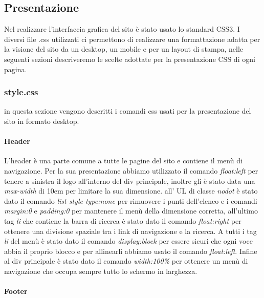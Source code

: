 \subsection{Presentazione}
Nel realizzare l'interfaccia grafica del sito è stato usato lo standard CSS3.\newline
I diversi file .css utilizzati ci permettono di realizzare una formattazione adatta per la visione del sito da un desktop, un mobile e per un layout di stampa, nelle seguenti sezioni descriveremo le scelte adottate per la presentazione CSS di ogni pagina.

\subsubsection{style.css}
in questa sezione vengono descritti i comandi css usati per la presentazione del sito in formato desktop.

\paragraph{Header} \mbox{}
L'header è una parte comune a tutte le pagine del sito e contiene il menù di navigazione. \newline Per la sua presentazione abbiamo utilizzato il comando \emph{float:left} per tenere a sinistra il logo all'interno del div principale, inoltre gli è stato data una \emph{max-width} di 10em per limitare la sua dimensione. all' UL di classe \emph{nodot} è stato dato il comando \emph{list-style-type:none} per rimuovere i punti dell'elenco e i comandi \emph{margin:0} e \emph{padding:0} per mantenere il menù della dimensione corretta, all'ultimo tag \emph{li} che contiene la barra di ricerca è stato dato il comando \emph{float:right} per ottenere una divisione spaziale tra i link di navigazione e la ricerca.
A tutti i tag \emph{li} del menù è stato dato il comando \emph{display:block} per essere sicuri che ogni voce abbia il proprio blocco e per allinearli abbiamo usato il comando \emph{float:left}.
Infine al div principale è stato dato il comando \emph{width:100\%} per ottenere un menù di navigazione che occupa sempre tutto lo schermo in larghezza.

\paragraph{Footer} \mbox{}



